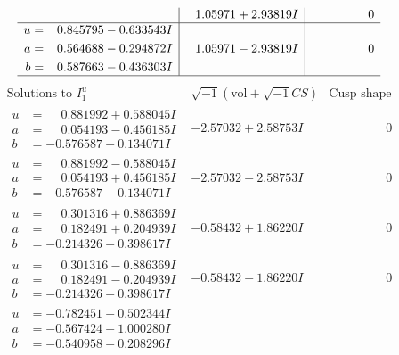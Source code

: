 \documentclass[1p]{elsarticle_modified}
\theoremstyle{definition}
\newcommand{\I}{\sqrt{-1}}
\begin{document}
$$\begin{array}{c|c|c}
 & \phantom{-}1.05971 + 2.93819 I & \phantom{-0.000000 } 0 \\ \hline\begin{aligned}
u &= \phantom{-}0.845795 - 0.633543 I \\
a &= \phantom{-}0.564688 - 0.294872 I \\
b &= \phantom{-}0.587663 - 0.436303 I\end{aligned}
 & \phantom{-}1.05971 - 2.93819 I & \phantom{-0.000000 } 0\\
 \hline 
 \end{array}$$\newpage$$\begin{array}{c|c|c}  
\text{Solutions to }I^u_{1}& \I (\text{vol} + \sqrt{-1}CS) & \text{Cusp shape}\\
 \hline 
\begin{aligned}
u &= \phantom{-}0.881992 + 0.588045 I \\
a &= \phantom{-}0.054193 - 0.456185 I \\
b &= -0.576587 - 0.134071 I\end{aligned}
 & -2.57032 + 2.58753 I & \phantom{-0.000000 } 0 \\ \hline\begin{aligned}
u &= \phantom{-}0.881992 - 0.588045 I \\
a &= \phantom{-}0.054193 + 0.456185 I \\
b &= -0.576587 + 0.134071 I\end{aligned}
 & -2.57032 - 2.58753 I & \phantom{-0.000000 } 0 \\ \hline\begin{aligned}
u &= \phantom{-}0.301316 + 0.886369 I \\
a &= \phantom{-}0.182491 + 0.204939 I \\
b &= -0.214326 + 0.398617 I\end{aligned}
 & -0.58432 + 1.86220 I & \phantom{-0.000000 } 0 \\ \hline\begin{aligned}
u &= \phantom{-}0.301316 - 0.886369 I \\
a &= \phantom{-}0.182491 - 0.204939 I \\
b &= -0.214326 - 0.398617 I\end{aligned}
 & -0.58432 - 1.86220 I & \phantom{-0.000000 } 0 \\ \hline\begin{aligned}
u &= -0.782451 + 0.502344 I \\
a &= -0.567424 + 1.000280 I \\
b &= -0.540958 - 0.208296 I\end{aligned}

\end{array}$$
\end{document}
